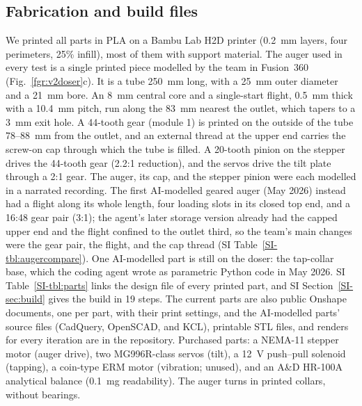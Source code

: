 \documentclass[twoside,twocolumn,9pt]{article}
\newcommand{\siref}[1]{\ref*{SI-#1}}
\begin{document}
\subsection{Fabrication and build files}
We printed all parts in PLA on a Bambu Lab H2D printer (0.2~mm layers, four perimeters, 25\% infill), most of them with support material. The auger used in every test is a single printed piece modelled by the team in Fusion~360 (Fig.~\ref{fgr:v2doser}c). It is a tube 250~mm long, with a 25~mm outer diameter and a 21~mm bore. An 8~mm central core and a single-start flight, 0.5~mm thick with a 10.4~mm pitch, run along the 83~mm nearest the outlet, which tapers to a 3~mm exit hole. A 44-tooth gear (module 1) is printed on the outside of the tube 78--88~mm from the outlet, and an external thread at the upper end carries the screw-on cap through which the tube is filled. A 20-tooth pinion on the stepper drives the 44-tooth gear (2.2:1 reduction), and the servos drive the tilt plate through a 2:1 gear. The auger, its cap, and the stepper pinion were each modelled in a narrated recording.\cite{FusionPlaylist} The first AI-modelled geared auger (May 2026) instead had a flight along its whole length, four loading slots in its closed top end, and a 16:48 gear pair (3:1); the agent's later storage version already had the capped upper end and the flight confined to the outlet third, so the team's main changes were the gear pair, the flight, and the cap thread (SI Table~\siref{tbl:augercompare}). One AI-modelled part is still on the doser: the tap-collar base, which the coding agent wrote as parametric Python code in May 2026. SI Table~\siref{tbl:parts} links the design file of every printed part, and SI Section~\siref{sec:build} gives the build in 19 steps. The current parts are also public Onshape documents, one per part, with their print settings, and the AI-modelled parts' source files (CadQuery, OpenSCAD, and KCL), printable STL files, and renders for every iteration are in the repository. Purchased parts: a NEMA-11 stepper motor (auger drive), two MG996R-class servos (tilt), a 12~V push--pull solenoid (tapping), a coin-type ERM motor (vibration; unused), and an A\&D HR-100A analytical balance (0.1~mg readability). The auger turns in printed collars, without bearings.
\end{document}
